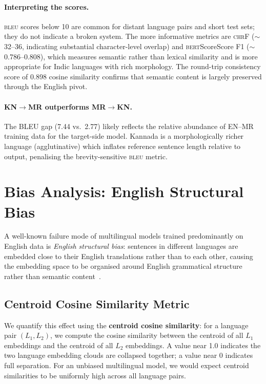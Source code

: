 \documentclass[11pt,a4paper]{article}
\newcommand{\bleu}{\textsc{bleu}}
\newcommand{\chrf}{\textsc{chr}F}
\newcommand{\bert}{\textsc{bert}Score}
\begin{document}
\paragraph{Interpreting the scores.}
\bleu{} scores below 10 are common for distant language pairs
and short test sets; they do not indicate a broken system.
The more informative metrics are \chrf{} ($\sim$32--36, indicating
substantial character-level overlap) and \bert{}Score F1
($\sim$0.786--0.808), which measures semantic rather than lexical
similarity and is more appropriate for Indic languages with
rich morphology.
The round-trip consistency score of 0.898 cosine similarity
confirms that semantic content is largely preserved through the
English pivot.

\paragraph{KN$\rightarrow$MR outperforms MR$\rightarrow$KN.}
The BLEU gap (7.44 vs.\ 2.77) likely reflects the relative
abundance of EN--MR training data for the target-side model.
Kannada is a morphologically richer language (agglutinative)
which inflates reference sentence length relative to output,
penalising the brevity-sensitive \bleu{} metric.

\section{Bias Analysis: English Structural Bias}
\label{sec:bias}

A well-known failure mode of multilingual models trained
predominantly on English data is \emph{English structural bias}:
sentences in different languages are embedded close to their
English translations rather than to each other, causing
the embedding space to be organised around English grammatical
structure rather than semantic content~\cite{pires2019multibert}.

\subsection{Centroid Cosine Similarity Metric}

We quantify this effect using the \textbf{centroid cosine
similarity}: for a language pair $(L_1, L_2)$, we compute
the cosine similarity between the centroid of all $L_1$
embeddings and the centroid of all $L_2$ embeddings.
A value near 1.0 indicates the two language embedding clouds
are collapsed together; a value near 0 indicates full separation.
For an unbiased multilingual model, we would expect
centroid similarities to be uniformly high across all language pairs.
\end{document}
